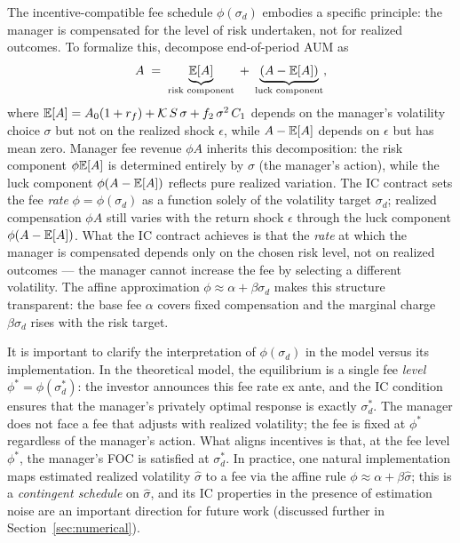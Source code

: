 The incentive-compatible fee schedule $\phi(\sigma_d)$ embodies a specific principle: the manager is compensated for the level of risk undertaken, not for realized outcomes. To formalize this, decompose end-of-period AUM as
\[
A \;=\; \underbrace{\mathbb{E}[A]}_{\text{risk component}} \;+\; \underbrace{(A - \mathbb{E}[A])}_{\text{luck component}},
\]
where $\mathbb{E}[A] = A_0(1+r_f) + \mathcal{K}\,S\,\sigma + f_2\,\sigma^2\,C_1$ depends on the manager's volatility choice $\sigma$ but not on the realized shock $\epsilon$, while $A - \mathbb{E}[A]$ depends on $\epsilon$ but has mean zero. Manager fee revenue $\phi A$ inherits this decomposition: the risk component $\phi\mathbb{E}[A]$ is determined entirely by $\sigma$ (the manager's action), while the luck component $\phi(A-\mathbb{E}[A])$ reflects pure realized variation. The IC contract sets the fee \emph{rate} $\phi = \phi(\sigma_d)$ as a function solely of the volatility target $\sigma_d$; realized compensation $\phi A$ still varies with the return shock $\epsilon$ through the luck component $\phi(A-\mathbb{E}[A])$. What the IC contract achieves is that the \emph{rate} at which the manager is compensated depends only on the chosen risk level, not on realized outcomes --- the manager cannot increase the fee by selecting a different volatility. The affine approximation $\phi \approx \alpha + \beta\sigma_d$ makes this structure transparent: the base fee $\alpha$ covers fixed compensation and the marginal charge $\beta\sigma_d$ rises with the risk target.

It is important to clarify the interpretation of $\phi(\sigma_d)$ in the model versus its implementation. In the theoretical model, the equilibrium is a single fee \emph{level} $\phi^* = \phi(\sigma_d^*)$: the investor announces this fee rate ex ante, and the IC condition ensures that the manager's privately optimal response is exactly $\sigma_d^*$. The manager does not face a fee that adjusts with realized volatility; the fee is fixed at $\phi^*$ regardless of the manager's action. What aligns incentives is that, at the fee level $\phi^*$, the manager's FOC is satisfied at $\sigma_d^*$. In practice, one natural implementation maps estimated realized volatility $\hat\sigma$ to a fee via the affine rule $\phi \approx \alpha + \beta\hat\sigma$; this is a \emph{contingent schedule} on $\hat\sigma$, and its IC properties in the presence of estimation noise are an important direction for future work (discussed further in Section~\ref{sec:numerical}).
